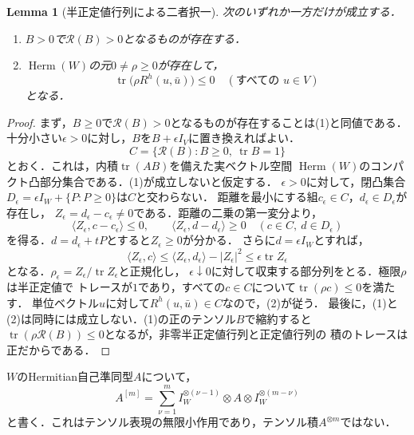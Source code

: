 \documentclass[12pt]{amsart}
\newtheorem{lem}[thm]{Lemma}
\theoremstyle{definition}
\theoremstyle{remark}
\numberwithin{equation}{section}
\DeclareMathOperator{\tr}{tr}
\theoremstyle{definition}
\begin{document}
\begin{lem}[半正定値行列による二者択一]\label{ja:alternative}
次のいずれか一方だけが成立する．
\begin{enumerate}
\item $B>0$で$\mathcal R(B)>0$となるものが存在する．
\item $\operatorname{Herm}(W)$の元$0\ne\rho\geq0$が存在して，
\begin{equation}\label{ja:obstruction}
 \tr\bigl(\rho R^h(u,\bar u)\bigr)\leq0\quad(\text{すべての }u\in V)
\end{equation}
となる．
\end{enumerate}
\end{lem}
\begin{proof}
まず，$B\geq0$で$\mathcal R(B)>0$となるものが存在することは(1)と同値である．
十分小さい$\epsilon>0$に対し，$B$を$B+\epsilon I_V$に置き換えればよい．
\[
 C=\{\mathcal R(B):B\geq0,\ \tr B=1\}
\]
とおく．これは，内積$\tr(AB)$を備えた実ベクトル空間
$\operatorname{Herm}(W)$のコンパクト凸部分集合である．(1)が成立しないと仮定する．
$\epsilon>0$に対して，閉凸集合
$D_\epsilon=\epsilon I_W+\{P:P\geq0\}$は$C$と交わらない．
距離を最小にする組$c_\epsilon\in C$，$d_\epsilon\in D_\epsilon$が存在し，
$Z_\epsilon=d_\epsilon-c_\epsilon\ne0$である．距離の二乗の第一変分より，
\[
 \langle Z_\epsilon,c-c_\epsilon\rangle\leq0,\qquad
 \langle Z_\epsilon,d-d_\epsilon\rangle\geq0
 \quad(c\in C,\ d\in D_\epsilon)
\]
を得る．$d=d_\epsilon+tP$とすると$Z_\epsilon\geq0$が分かる．
さらに$d=\epsilon I_W$とすれば，
\[
 \langle Z_\epsilon,c\rangle\leq
 \langle Z_\epsilon,d_\epsilon\rangle-|Z_\epsilon|^2
 \leq\epsilon\tr Z_\epsilon
\]
となる．$\rho_\epsilon=Z_\epsilon/\tr Z_\epsilon$と正規化し，
$\epsilon\downarrow0$に対して収束する部分列をとる．極限$\rho$は半正定値で
トレースが$1$であり，すべての$c\in C$について$\tr(\rho c)\leq0$を満たす．
単位ベクトル$u$に対して$R^h(u,\bar u)\in C$なので，(2)が従う．
最後に，(1)と(2)は同時には成立しない．(1)の正のテンソル$B$で縮約すると
$\tr(\rho\mathcal R(B))\leq0$となるが，非零半正定値行列と正定値行列の
積のトレースは正だからである．
\end{proof}

$W$のHermitian自己準同型$A$について，
\[
 A^{[m]}=\sum_{\nu=1}^m
 I_W^{\otimes(\nu-1)}\otimes A\otimes
 I_W^{\otimes(m-\nu)}
\]
と書く．これはテンソル表現の無限小作用であり，テンソル積$A^{\otimes m}$ではない．
\end{document}
